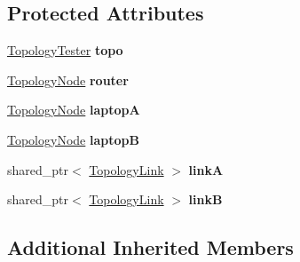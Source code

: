 \subsection*{Protected Attributes}
\begin{DoxyCompactItemize}
\item 
\hyperlink{classnfd_1_1fw_1_1tests_1_1TopologyTester}{Topology\+Tester} {\bfseries topo}\hypertarget{classnfd_1_1fw_1_1tests_1_1TwoLaptopsFixture_a97e218b8f370fe566ca3a8c3d5dc9f22}{}\label{classnfd_1_1fw_1_1tests_1_1TwoLaptopsFixture_a97e218b8f370fe566ca3a8c3d5dc9f22}

\item 
\hyperlink{topology-tester_8hpp_a65eed57bba998574cb3a2e62126f33e8}{Topology\+Node} {\bfseries router}\hypertarget{classnfd_1_1fw_1_1tests_1_1TwoLaptopsFixture_a4b37f94b3dd4969d6c4a04372fa1fa5b}{}\label{classnfd_1_1fw_1_1tests_1_1TwoLaptopsFixture_a4b37f94b3dd4969d6c4a04372fa1fa5b}

\item 
\hyperlink{topology-tester_8hpp_a65eed57bba998574cb3a2e62126f33e8}{Topology\+Node} {\bfseries laptopA}\hypertarget{classnfd_1_1fw_1_1tests_1_1TwoLaptopsFixture_aba193922de0c46eeccf7f932485f8bca}{}\label{classnfd_1_1fw_1_1tests_1_1TwoLaptopsFixture_aba193922de0c46eeccf7f932485f8bca}

\item 
\hyperlink{topology-tester_8hpp_a65eed57bba998574cb3a2e62126f33e8}{Topology\+Node} {\bfseries laptopB}\hypertarget{classnfd_1_1fw_1_1tests_1_1TwoLaptopsFixture_a38ea57e11b0d90c3b465fb82eec2ed25}{}\label{classnfd_1_1fw_1_1tests_1_1TwoLaptopsFixture_a38ea57e11b0d90c3b465fb82eec2ed25}

\item 
shared\+\_\+ptr$<$ \hyperlink{classnfd_1_1fw_1_1tests_1_1TopologyLink}{Topology\+Link} $>$ {\bfseries linkA}\hypertarget{classnfd_1_1fw_1_1tests_1_1TwoLaptopsFixture_a078914811fea0f6e3fe51c58ca7fb363}{}\label{classnfd_1_1fw_1_1tests_1_1TwoLaptopsFixture_a078914811fea0f6e3fe51c58ca7fb363}

\item 
shared\+\_\+ptr$<$ \hyperlink{classnfd_1_1fw_1_1tests_1_1TopologyLink}{Topology\+Link} $>$ {\bfseries linkB}\hypertarget{classnfd_1_1fw_1_1tests_1_1TwoLaptopsFixture_ac54e888098a2d543a8283d1605a715ec}{}\label{classnfd_1_1fw_1_1tests_1_1TwoLaptopsFixture_ac54e888098a2d543a8283d1605a715ec}

\end{DoxyCompactItemize}
\subsection*{Additional Inherited Members}



